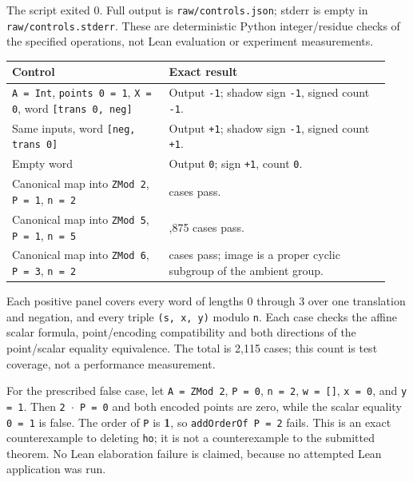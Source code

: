 \documentclass[10pt]{article}
\begin{document}
The script exited 0. Full output is \texttt{raw\allowbreak{}/\allowbreak{}controls\allowbreak{}.\allowbreak{}json}; stderr is empty in \texttt{raw\allowbreak{}/\allowbreak{}controls\allowbreak{}.\allowbreak{}stderr}. These are deterministic Python integer/residue checks of the specified operations, not Lean evaluation or experiment measurements.


\small\begin{longtable}{>{\raggedright\arraybackslash}p{0.39\linewidth}>{\raggedright\arraybackslash}p{0.55\linewidth}}
\hline
Control & Exact result \\ \hline
\texttt{A = Int}, \texttt{points 0 = 1}, \texttt{X = 0}, word \texttt{[trans 0, neg]} & Output \texttt{\allowbreak{}-\allowbreak{}1}; shadow sign \texttt{\allowbreak{}-\allowbreak{}1}, signed count \texttt{\allowbreak{}-\allowbreak{}1}. \\
Same inputs, word \texttt{[neg, trans 0]} & Output \texttt{+1}; shadow sign \texttt{\allowbreak{}-\allowbreak{}1}, signed count \texttt{+1}. \\
Empty word & Output \texttt{0}; sign \texttt{+1}, count \texttt{0}. \\
Canonical map into \texttt{ZMod 2}, \texttt{P = 1}, \texttt{n = 2} & 120 cases pass. \\
Canonical map into \texttt{ZMod 5}, \texttt{P = 1}, \texttt{n = 5} & 1,875 cases pass. \\
Canonical map into \texttt{ZMod 6}, \texttt{P = 3}, \texttt{n = 2} & 120 cases pass; image is a proper cyclic subgroup of the ambient group. \\
\hline\end{longtable}\normalsize


Each positive panel covers every word of lengths 0 through 3 over one translation and negation, and every triple \texttt{(s, x, y)} modulo \texttt{n}. Each case checks the affine scalar formula, point/encoding compatibility and both directions of the point/scalar equality equivalence. The total is 2,115 cases; this count is test coverage, not a performance measurement.


For the prescribed false case, let \texttt{A = ZMod 2}, \texttt{P = 0}, \texttt{n = 2}, \texttt{w = []}, \texttt{x = 0}, and \texttt{y = 1}. Then \texttt{2 $\cdot$ P = 0} and both encoded points are zero, while the scalar equality \texttt{0 = 1} is false. The order of \texttt{P} is \textbf{1}, so \texttt{addOrderOf P = 2} fails. This is an exact counterexample to deleting \texttt{ho}; it is not a counterexample to the submitted theorem. No Lean elaboration failure is claimed, because no attempted Lean application was run.
\end{document}
